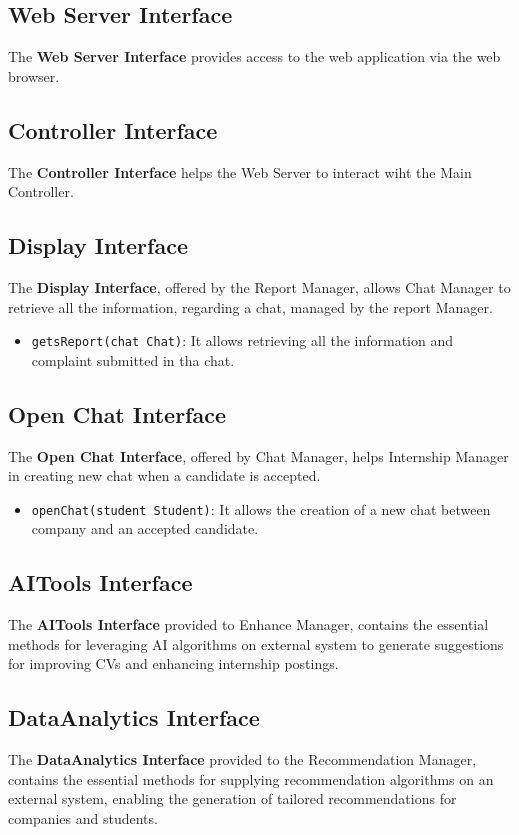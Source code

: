 \subsection{Web Server Interface}
The \textbf{Web Server Interface} provides access to the web application via the web browser. 

\subsection{Controller Interface}
The \textbf{Controller Interface} helps the Web Server to interact wiht the Main Controller.
\subsection{Display Interface}
The \textbf{Display Interface}, offered by the Report Manager, allows Chat Manager to retrieve all the information, regarding a chat, managed by the report Manager. 
\begin{itemize}
    \item \texttt{getsReport(chat Chat)}: It allows retrieving all the information and complaint submitted in tha chat.
\end{itemize}

\subsection{Open Chat Interface}
The \textbf{Open Chat Interface}, offered by Chat Manager, helps Internship Manager in creating new chat when a candidate is accepted.
\begin{itemize}
    \item \texttt{openChat(student Student)}: It allows the creation of a new chat between company and an accepted candidate.
\end{itemize}

\subsection{AITools Interface}
The \textbf{AITools Interface} provided to Enhance Manager, contains the essential methods for leveraging AI algorithms on external system to generate suggestions for improving CVs and enhancing internship postings. 


\subsection{DataAnalytics Interface}
The \textbf{DataAnalytics Interface} provided to the Recommendation Manager, contains the essential methods for supplying recommendation algorithms on an external system, enabling the generation of tailored recommendations for companies and students. 

